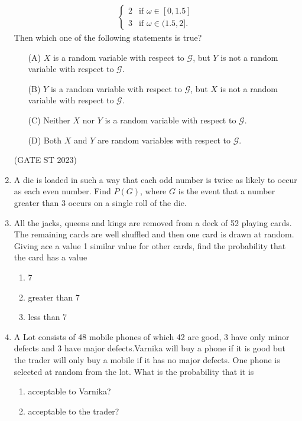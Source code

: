\begin{enumerate}[label=\thesection.\arabic*,ref=\thesection.\theenumi]
\begin{align*}
\begin{cases}
        2 & \text{if }\omega \in [0, 1.5]\\
        3 & \text{if }\omega \in (1.5, 2].
    \end{cases}
\end{align*}
Then which one of the following statements is true?
\begin{enumerate}
    \item [(A)] $X$ is a random variable with respect to $\mathcal{G}$, but $Y$ is not a random variable with respect to $\mathcal{G}$.
    \item [(B)] $Y$ is a random variable with respect to $\mathcal{G}$, but $X$ is not a random variable with respect to $\mathcal{G}$.
    \item [(C)] Neither $X$ nor $Y$ is a random variable with respect to $\mathcal{G}$.
    \item [(D)] Both $X$ and $Y$ are random variables with respect to $\mathcal{G}$.
\end{enumerate} \hfill (GATE ST 2023)\\
\solution
%
	\item  A die is loaded in such a way that each odd number is twice as likely to occur as
each even number. Find $P(G)$, where $G$ is the event that a number greater than
3 occurs on a single roll of the die.
\\
\solution
	\item All the jacks, queens and kings are removed from a deck of 52 playing cards. The remaining cards are well shuffled and then one card is drawn at random. Giving ace a value 1 similar value for other cards, find the probability that the card has a value 
		\begin{enumerate}
			\item 7
			\item greater than 7
			\item less than 7
		\end{enumerate}
  \item A Lot consists of 48 mobile phones of which 42 are good, 3 have only minor defects and 3 have major defects.Varnika will buy a phone if it is good but the trader will only buy a mobile if it has no major defects. One phone is selected at random from the lot. What is the probability that it is
\begin{enumerate}
	\item acceptable to Varnika?
            \item acceptable to the trader?

\end{enumerate}
\end{enumerate}
